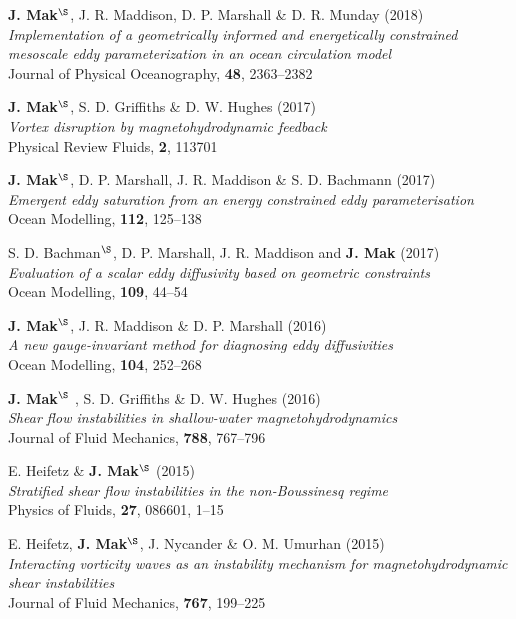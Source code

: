 \documentclass[letterpaper]{article}
\renewenvironment{itemize}{
  \begin{list}{}{
    \setlength{\leftmargin}{1.5em}
  }
}{
  \end{list}
}
\begin{document}
\begin{itemize}
\item[9.] \textbf{J. Mak}$^{\S}$, J. R. Maddison, D. P. Marshall \& D. R. Munday
(2018)\\
\textit{Implementation of a geometrically informed and energetically constrained
mesoscale eddy parameterization in an ocean circulation model}\\
Journal of Physical Oceanography, \textbf{48}, 2363--2382

\item[8.] \textbf{J. Mak}$^{\S}$, S. D. Griffiths \& D. W. Hughes
(2017)\\
\textit{Vortex disruption by magnetohydrodynamic feedback}\\
Physical Review Fluids, \textbf{2}, 113701

\item[7.] \textbf{J. Mak}$^{\S}$, D. P. Marshall, J. R. Maddison \& S. D. Bachmann
(2017)\\
\textit{Emergent eddy saturation from an energy constrained eddy parameterisation}\\
Ocean Modelling, \textbf{112}, 125--138

\item[6.] S. D. Bachman$^{\S}$, D. P. Marshall, J. R. Maddison and \textbf{J. Mak}
(2017)\\
\textit{Evaluation of a scalar eddy diffusivity based on geometric constraints}\\
Ocean Modelling, \textbf{109}, 44--54

\item[5.] \textbf{J. Mak}$^{\S}$, J. R. Maddison \& D. P. Marshall
(2016)\\
\textit{A new gauge-invariant method for diagnosing eddy diffusivities}\\
Ocean Modelling, \textbf{104}, 252--268

\item[4.] \textbf{J. Mak}$^{\S}$ , S. D. Griffiths \& D. W. Hughes
(2016)\\
\textit{Shear flow instabilities in shallow-water magnetohydrodynamics}\\
Journal of Fluid Mechanics, \textbf{788}, 767--796

\item[3.] E. Heifetz \& \textbf{J. Mak}$^{\S}$ (2015)\\
\textit{Stratified shear flow instabilities in the non-Boussinesq regime}\\
Physics of Fluids, \textbf{27}, 086601, 1--15

\item[2.] E. Heifetz, \textbf{J. Mak}$^{\S}$, J. Nycander \& O. M.
Umurhan (2015)\\
\textit{Interacting vorticity waves as an instability mechanism for
magnetohydrodynamic shear instabilities}\\
Journal of Fluid Mechanics, \textbf{767}, 199--225


\end{itemize}
\end{document}
